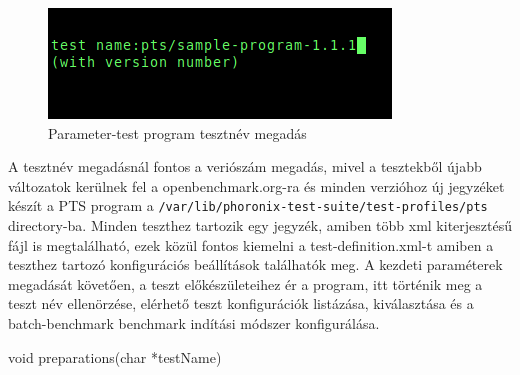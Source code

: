 \begin{figure}[h!]
\centering
\includegraphics[scale=2.0]{images/parameter-testInit.png}
\caption{Parameter-test program tesztnév megadás}
\label{fig:parameter-testInit}
\end{figure}

A tesztnév megadásnál fontos a veriószám megadás, mivel a tesztekből újabb változatok kerülnek fel a openbenchmark.org-ra és minden verzióhoz új jegyzéket készít a PTS program a \texttt{/var/lib/phoronix-test-suite/test-profiles/pts} directory-ba.
Minden teszthez tartozik egy jegyzék, amiben több xml kiterjesztésű fájl is megtalálható, ezek közül fontos kiemelni a test-definition.xml-t amiben a teszthez tartozó konfigurációs beállítások találhatók meg.
A kezdeti paraméterek megadását követően, a teszt előkészületeihez ér a program, itt történik meg a teszt név ellenörzése, elérhető teszt konfigurációk listázása, kiválasztása és a batch-benchmark benchmark indítási módszer konfigurálása. 

\begin{cpp}
void preparations(char *testName)
\end{cpp}

